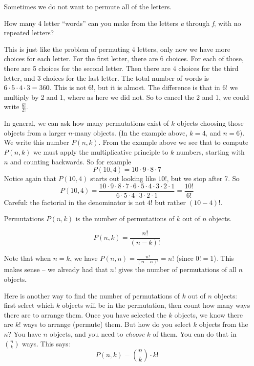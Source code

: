 \documentclass[12pt]{article}
\begin{document}
Sometimes we do not want to permute all of the letters. 

\begin{example}
  How many 4 letter ``words'' can you make from the letters \textit{a} through \textit{f}, with no repeated letters?
  \begin{solution}
    This is just like the problem of permuting 4 letters, only now we have more choices for each letter.  For the first letter, there are 6 choices.  For each of those, there are 5 choices for the second letter.  Then there are 4 choices for the third letter, and 3 choices for the last letter.  The total number of words is $6\cdot 5\cdot 4 \cdot 3 = 360$.  This is not $6!$, but it is almost.  The difference is that in $6!$ we multiply by 2 and 1, where as here we did not.  So to cancel the 2 and 1, we could write $\frac{6!}{2!}$.
  \end{solution}
\end{example}

In general, we can ask how many permutations exist of $k$ objects choosing those objects from a larger $n$-many objects.  (In the example above, $k = 4$, and $n = 6$).  We write this number $P(n,k)$.  From the example above we see that to compute $P(n,k)$ we must apply the multiplicative principle to $k$ numbers, starting with $n$ and counting backwards.  So for example
\[P(10, 4) = 10\cdot 9 \cdot 8 \cdot 7\]
Notice again that $P(10,4)$ starts out looking like $10!$, but we stop after 7.  So
\[P(10,4) = \frac{10\cdot 9 \cdot 8 \cdot 7 \cdot 6 \cdot 5 \cdot 4 \cdot 3 \cdot 2 \cdot 1}{6 \cdot 5 \cdot 4 \cdot 3 \cdot 2 \cdot 1} = \frac{10!}{6!}\]
Careful: the factorial in the denominator is not $4!$ but rather $(10-4)!$.  

\begin{defbox}{Permutations}
 $P(n,k)$ is the number of permutations of $k$ out of $n$ objects.
 
 \[P(n,k) = \frac{n!}{(n-k)!}\]
\end{defbox}

Note that when $n = k$, we have $P(n,n) = \frac{n!}{(n-n)!} = n!$ (since $0! = 1$).  This makes sense -- we already had that $n!$ gives the number of permutations of all $n$ objects.

Here is another way to find the number of permutations of $k$ out of $n$ objects: first select which $k$ objects will be in the permutation, then count how many ways there are to arrange them.  Once you have selected the $k$ objects, we know there are $k!$ ways to arrange (permute) them.  But how do you select $k$ objects from the $n$?  You have $n$ objects, and you need to {\em choose} $k$ of them.  You can do that in ${n \choose k}$ ways.  This says:
\[P(n,k) = {n \choose k}\cdot k!\]
\end{document}
